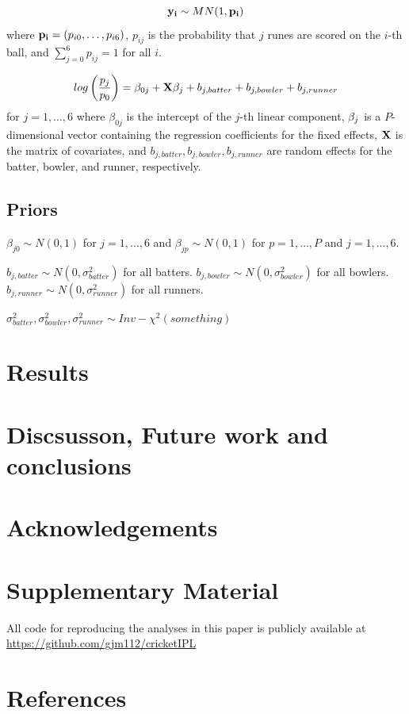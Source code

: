 \documentclass[
  12pt,
]{article}
\begin{document}
\[
{\bf y_i} \sim MN(1,{\bf p_i})
\] where \({\bf p_{i}} = \left(p_{i0},\ldots,p_{i6}\right)\), \(p_{ij}\)
is the probability that \(j\) runes are scored on the \(i\)-th ball, and
\(\sum_{j = 0}^{6} p_{ij} = 1\) for all \(i\).

\[
log\left(\frac{p_{j}}{p_{0}}\right) = \beta_{0j} + {\bf X}{\bf \beta}_j + b_{j,batter} + b_{j,bowler} + b_{j,runner}
\] for \(j = 1,\ldots,6\) where \(\beta_{0j}\) is the intercept of the
\(j\)-th linear component, \({\bf \beta}_j\) is a \(P\)-dimensional
vector containing the regression coefficients for the fixed effects,
\({\bf X}\) is the matrix of covariates, and
\(b_{j,batter}, b_{j,bowler}, b_{j,runner}\) are random effects for the
batter, bowler, and runner, respectively.

\hypertarget{priors}{%
\subsection{Priors}\label{priors}}

\(\beta_{j0} \sim N(0,1)\) for \(j = 1, \ldots, 6\) and
\(\beta_{jp} \sim N(0,1)\) for \(p = 1, \ldots, P\) and
\(j = 1, \ldots, 6\).

\(b_{j,batter} \sim N(0,\sigma^2_{batter})\) for all batters.
\(b_{j,bowler} \sim N(0,\sigma^2_{bowler})\) for all bowlers.
\(b_{j,runner} \sim N(0,\sigma^2_{runner})\) for all runners.

\(\sigma^2_{batter}, \sigma^2_{bowler}, \sigma^2_{runner} \sim Inv-\chi^2(something)\)

\hypertarget{sec:results}{%
\section{Results}\label{sec:results}}

\hypertarget{sec:conclusions}{%
\section{Discsusson, Future work and
conclusions}\label{sec:conclusions}}

\hypertarget{acknowledgements}{%
\section*{Acknowledgements}\label{acknowledgements}}

\hypertarget{supplementary-material}{%
\section*{Supplementary Material}\label{supplementary-material}}

All code for reproducing the analyses in this paper is publicly
available at \url{https://github.com/gjm112/cricketIPL}

\hypertarget{references}{%
\section{References}\label{references}}
\end{document}
